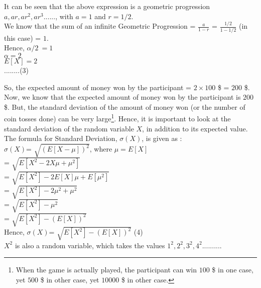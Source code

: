 \documentclass{book}
\begin{document}
It can be seen that the above expression is a geometric progression $a,ar,ar^2,ar^3......$, with $a=1$ and $r=1/2$.\\

We know that the sum of an infinite Geometric Progression = $\frac{a}{1-r}$ = $\frac{1/2}{1-1/2}$ (in this case) = $1$. \\

Hence, $\alpha/2\ = 1$\\

$\alpha=2$\\

$E[X]=2$\\  	\hspace{5mm} ........(3)

So, the expected amount of money won by the participant = $2 \times 100$ \$ = $200$ \$.\\

Now, we know that the expected amount of money won by the participant is $200$ \$. But, the standard deviation of the amount of money won (or the number of coin tosses done) can be very large\footnote{When the game is actually played, the participant can win $100$ \$ in one case, yet $500$ \$ in other case, yet $10000$ \$ in other case.}. Hence, it is important to look at the standard deviation of the random variable $X$, in addition to its expected value.\\

The formula for Standard Deviation, $\sigma(X)$, is given as :\\ 

$\sigma(X)$= $ \sqrt{(E[X- \mu])^2} $, where $\mu = E[X]$\\


= $ \sqrt{E[X^2 - 2 X \mu + \mu ^ 2]} $\\

= $ \sqrt{E[X^2 ]- 2 E[X] \mu + E[\mu ^ 2]} $\\

= $ \sqrt{E[X^2 ]- 2 \mu^2 + \mu ^ 2} $\\

= $ \sqrt{E[X^2 ]- \mu ^ 2} $\\

= $ \sqrt{E[X^2 ]- (E[X]) ^ 2} $\\

Hence, $\sigma(X)$=  $ \sqrt{E[X^2 ]- (E[X]) ^ 2} $	(4)\\

$X^2$ is also a random variable, which takes the values $1^2, 2^2, 3^2, 4^2..........$\\
\end{document}
